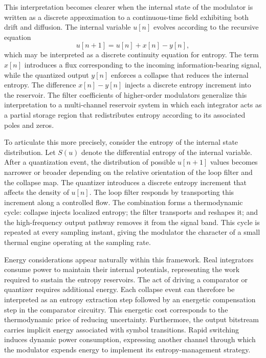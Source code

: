 This interpretation becomes clearer when the internal state of the modulator is written as a discrete approximation to a continuous-time field exhibiting both drift and diffusion. The internal variable \(u[n]\) evolves according to the recursive equation
\[
u[n+1] = u[n] + x[n] - y[n],
\]
which may be interpreted as a discrete continuity equation for entropy. The term \(x[n]\) introduces a flux corresponding to the incoming information-bearing signal, while the quantized output \(y[n]\) enforces a collapse that reduces the internal entropy. The difference \(x[n] - y[n]\) injects a discrete entropy increment into the reservoir. The filter coefficients of higher-order modulators generalize this interpretation to a multi-channel reservoir system in which each integrator acts as a partial storage region that redistributes entropy according to its associated poles and zeros.

To articulate this more precisely, consider the entropy of the internal state distribution. Let \(S(u)\) denote the differential entropy of the internal variable. After a quantization event, the distribution of possible \(u[n+1]\) values becomes narrower or broader depending on the relative orientation of the loop filter and the collapse map. The quantizer introduces a discrete entropy increment that affects the density of \(u[n]\). The loop filter responds by transporting this increment along a controlled flow. The combination forms a thermodynamic cycle: collapse injects localized entropy; the filter transports and reshapes it; and the high-frequency output pathway removes it from the signal band. This cycle is repeated at every sampling instant, giving the modulator the character of a small thermal engine operating at the sampling rate.

Energy considerations appear naturally within this framework. Real integrators consume power to maintain their internal potentials, representing the work required to sustain the entropy reservoirs. The act of driving a comparator or quantizer requires additional energy. Each collapse event can therefore be interpreted as an entropy extraction step followed by an energetic compensation step in the comparator circuitry. This energetic cost corresponds to the thermodynamic price of reducing uncertainty. Furthermore, the output bitstream carries implicit energy associated with symbol transitions. Rapid switching induces dynamic power consumption, expressing another channel through which the modulator expends energy to implement its entropy-management strategy.

